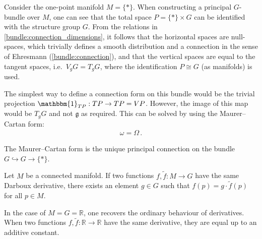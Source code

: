     \begin{construct}
        Consider the one-point manifold $M=\{\ast\}$. When constructing a principal $G$-bundle over $M$, one can see that the total space $P=\{\ast\}\times G$ can be identified with the structure group $G$. From the relations in \cref{bundle:connection_dimensions}, it follows that the horizontal spaces are null-spaces, which trivially defines a smooth distribution and a connection in the sense of Ehresmann (\cref{bundle:connection}), and that the vertical spaces are equal to the tangent spaces, i.e.~$V_gG=T_gG$, where the identification $P\cong G$ (as manifolds) is used.

        The simplest way to define a connection form on this bundle would be the trivial projection $\mathbbm{1}_{TP}:TP\rightarrow TP=VP$. However, the image of this map would be $T_gG$ and not $\mathfrak{g}$ as required. This can be solved by using the Maurer--Cartan form:
        \begin{gather}
            \omega = \Omega\,.
        \end{gather}
    \end{construct}
    \begin{property}[Uniqueness]
        The Maurer--Cartan form is the unique principal connection on the bundle $G\hookrightarrow G\rightarrow\{\ast\}$.
    \end{property}


    \begin{property}
        Let $M$ be a connected manifold. If two functions $f,\widetilde{f}:M\rightarrow G$ have the same Darboux derivative, there exists an element $g\in G$ such that $f(p)=g\cdot\widetilde{f}(p)$ for all $p\in M$.
    \end{property}
    \begin{example}
        In the case of $M=G=\mathbb{R}$, one recovers the ordinary behaviour of derivatives. When two functions $f,\widetilde{f}:\mathbb{R}\rightarrow\mathbb{R}$ have the same derivative, they are equal up to an additive constant.
    \end{example}

